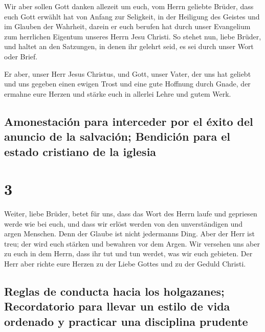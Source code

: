  Wir aber sollen Gott danken allezeit um euch, vom Herrn
geliebte Brüder, dass euch Gott erwählt hat von Anfang zur Seligkeit, in
der Heiligung des Geistes und im Glauben der Wahrheit, 
darein er euch berufen hat durch unser Evangelium zum herrlichen
Eigentum unseres Herrn Jesu Christi.  So stehet nun,
liebe Brüder, und haltet an den Satzungen, in denen ihr gelehrt seid, es
sei durch unser Wort oder Brief.

 Er aber, unser Herr Jesus Christus, und Gott, unser
Vater, der uns hat geliebt und uns gegeben einen ewigen Trost und eine
gute Hoffnung durch Gnade,  der ermahne eure Herzen und
stärke euch in allerlei Lehre und gutem Werk.

\hypertarget{amonestaciuxf3n-para-interceder-por-el-uxe9xito-del-anuncio-de-la-salvaciuxf3n-bendiciuxf3n-para-el-estado-cristiano-de-la-iglesia}{%
\subsection{Amonestación para interceder por el éxito del anuncio de la
salvación; Bendición para el estado cristiano de la
iglesia}\label{amonestaciuxf3n-para-interceder-por-el-uxe9xito-del-anuncio-de-la-salvaciuxf3n-bendiciuxf3n-para-el-estado-cristiano-de-la-iglesia}}

\hypertarget{section-2}{%
\section{3}\label{section-2}}

 Weiter, liebe Brüder, betet für uns, dass das Wort des
Herrn laufe und gepriesen werde wie bei euch,  und dass
wir erlöst werden von den unverständigen und argen Menschen. Denn der
Glaube ist nicht jedermanns Ding.  Aber der Herr ist treu;
der wird euch stärken und bewahren vor dem Argen.  Wir
versehen uns aber zu euch in dem Herrn, dass ihr tut und tun werdet, was
wir euch gebieten.  Der Herr aber richte eure Herzen zu
der Liebe Gottes und zu der Geduld Christi.

\hypertarget{reglas-de-conducta-hacia-los-holgazanes-recordatorio-para-llevar-un-estilo-de-vida-ordenado-y-practicar-una-disciplina-prudente}{%
\subsection{Reglas de conducta hacia los holgazanes; Recordatorio para
llevar un estilo de vida ordenado y practicar una disciplina
prudente}\label{reglas-de-conducta-hacia-los-holgazanes-recordatorio-para-llevar-un-estilo-de-vida-ordenado-y-practicar-una-disciplina-prudente}}

